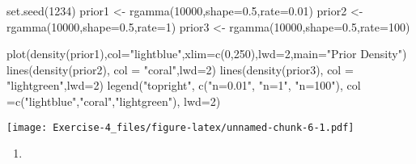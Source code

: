 \documentclass[
]{article}
\newenvironment{Shaded}{\begin{snugshade}}{\end{snugshade}}
\newcommand{\AttributeTok}[1]{\textcolor[rgb]{0.77,0.63,0.00}{#1}}
\newcommand{\DecValTok}[1]{\textcolor[rgb]{0.00,0.00,0.81}{#1}}
\newcommand{\FloatTok}[1]{\textcolor[rgb]{0.00,0.00,0.81}{#1}}
\newcommand{\FunctionTok}[1]{\textcolor[rgb]{0.00,0.00,0.00}{#1}}
\newcommand{\NormalTok}[1]{#1}
\newcommand{\OtherTok}[1]{\textcolor[rgb]{0.56,0.35,0.01}{#1}}
\newcommand{\StringTok}[1]{\textcolor[rgb]{0.31,0.60,0.02}{#1}}
\providecommand{\tightlist}{%
  \setlength{\itemsep}{0pt}\setlength{\parskip}{0pt}}
\begin{document}
\begin{Shaded}
\begin{Highlighting}[]
\FunctionTok{set.seed}\NormalTok{(}\DecValTok{1234}\NormalTok{)}
\NormalTok{prior1 }\OtherTok{\textless{}{-}} \FunctionTok{rgamma}\NormalTok{(}\DecValTok{10000}\NormalTok{,}\AttributeTok{shape=}\FloatTok{0.5}\NormalTok{,}\AttributeTok{rate=}\FloatTok{0.01}\NormalTok{)}
\NormalTok{prior2 }\OtherTok{\textless{}{-}} \FunctionTok{rgamma}\NormalTok{(}\DecValTok{10000}\NormalTok{,}\AttributeTok{shape=}\FloatTok{0.5}\NormalTok{,}\AttributeTok{rate=}\DecValTok{1}\NormalTok{)}
\NormalTok{prior3 }\OtherTok{\textless{}{-}} \FunctionTok{rgamma}\NormalTok{(}\DecValTok{10000}\NormalTok{,}\AttributeTok{shape=}\FloatTok{0.5}\NormalTok{,}\AttributeTok{rate=}\DecValTok{100}\NormalTok{)}

\FunctionTok{plot}\NormalTok{(}\FunctionTok{density}\NormalTok{(prior1),}\AttributeTok{col=}\StringTok{"lightblue"}\NormalTok{,}\AttributeTok{xlim=}\FunctionTok{c}\NormalTok{(}\DecValTok{0}\NormalTok{,}\DecValTok{250}\NormalTok{),}\AttributeTok{lwd=}\DecValTok{2}\NormalTok{,}\AttributeTok{main=}\StringTok{"Prior Density"}\NormalTok{)}
\FunctionTok{lines}\NormalTok{(}\FunctionTok{density}\NormalTok{(prior2), }\AttributeTok{col =} \StringTok{"coral"}\NormalTok{,}\AttributeTok{lwd=}\DecValTok{2}\NormalTok{)}
\FunctionTok{lines}\NormalTok{(}\FunctionTok{density}\NormalTok{(prior3), }\AttributeTok{col =} \StringTok{"lightgreen"}\NormalTok{,}\AttributeTok{lwd=}\DecValTok{2}\NormalTok{)}
\FunctionTok{legend}\NormalTok{(}\StringTok{"topright"}\NormalTok{, }\FunctionTok{c}\NormalTok{(}\StringTok{"n=0.01"}\NormalTok{, }\StringTok{"n=1"}\NormalTok{, }\StringTok{"n=100"}\NormalTok{),}
       \AttributeTok{col =}\FunctionTok{c}\NormalTok{(}\StringTok{"lightblue"}\NormalTok{,}\StringTok{"coral"}\NormalTok{,}\StringTok{"lightgreen"}\NormalTok{), }\AttributeTok{lwd=}\DecValTok{2}\NormalTok{)}
\end{Highlighting}
\end{Shaded}

\texttt{[image: Exercise-4\_files/figure-latex/unnamed-chunk-6-1.pdf]}

\begin{enumerate}
\def\labelenumi{\arabic{enumi}.}
\setcounter{enumi}{2}
\tightlist
\item
\end{enumerate}
\end{document}
